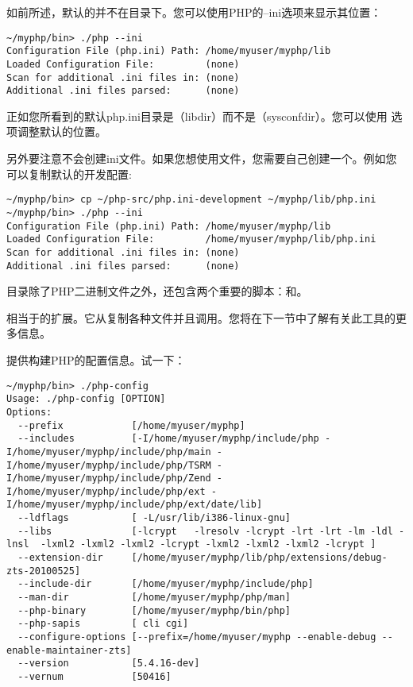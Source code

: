如前所述，默认的并不在目录下。您可以使用PHP的--ini选项来显示其位置：

\begin{lstlisting}[language=shell]
~/myphp/bin> ./php --ini
Configuration File (php.ini) Path: /home/myuser/myphp/lib
Loaded Configuration File:         (none)
Scan for additional .ini files in: (none)
Additional .ini files parsed:      (none)
\end{lstlisting}

正如您所看到的默认php.ini目录是（libdir）而不是（sysconfdir）。您可以使用 选项调整默认的位置。

另外要注意不会创建ini文件。如果您想使用文件，您需要自己创建一个。例如您可以复制默认的开发配置:

\begin{lstlisting}[language=shell]
~/myphp/bin> cp ~/php-src/php.ini-development ~/myphp/lib/php.ini
~/myphp/bin> ./php --ini
Configuration File (php.ini) Path: /home/myuser/myphp/lib
Loaded Configuration File:         /home/myuser/myphp/lib/php.ini
Scan for additional .ini files in: (none)
Additional .ini files parsed:      (none)
\end{lstlisting}

目录除了PHP二进制文件之外，还包含两个重要的脚本：和。

相当于的扩展。它从复制各种文件并且调用。您将在下一节中了解有关此工具的更多信息。

 提供构建PHP的配置信息。试一下：

\begin{lstlisting}[language=shell]
~/myphp/bin> ./php-config
Usage: ./php-config [OPTION]
Options:
  --prefix            [/home/myuser/myphp]
  --includes          [-I/home/myuser/myphp/include/php -I/home/myuser/myphp/include/php/main -I/home/myuser/myphp/include/php/TSRM -I/home/myuser/myphp/include/php/Zend -I/home/myuser/myphp/include/php/ext -I/home/myuser/myphp/include/php/ext/date/lib]
  --ldflags           [ -L/usr/lib/i386-linux-gnu]
  --libs              [-lcrypt   -lresolv -lcrypt -lrt -lrt -lm -ldl -lnsl  -lxml2 -lxml2 -lxml2 -lcrypt -lxml2 -lxml2 -lxml2 -lcrypt ]
  --extension-dir     [/home/myuser/myphp/lib/php/extensions/debug-zts-20100525]
  --include-dir       [/home/myuser/myphp/include/php]
  --man-dir           [/home/myuser/myphp/php/man]
  --php-binary        [/home/myuser/myphp/bin/php]
  --php-sapis         [ cli cgi]
  --configure-options [--prefix=/home/myuser/myphp --enable-debug --enable-maintainer-zts]
  --version           [5.4.16-dev]
  --vernum            [50416]
\end{lstlisting}

